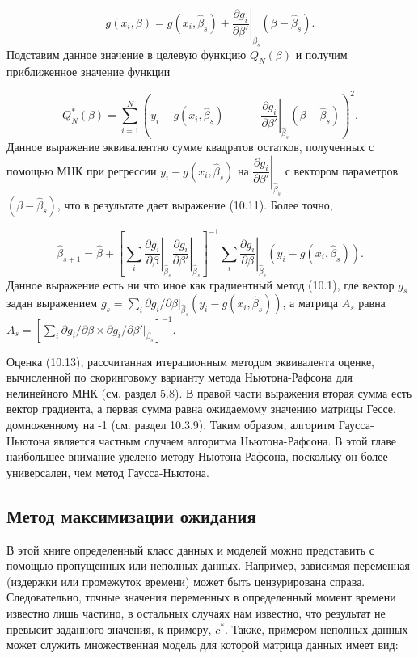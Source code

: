 \[
g(x_{i},\beta) = \left. g(x_i,\hat{\beta}_s)+\dfrac{\partial{g_i}}{\partial{\beta}'} \right|_{\hat{\beta}_s}(\beta-\hat{\beta}_s).
\]
Подставим данное значение в целевую функцию $Q_N (\beta)$ и получим приближенное значение функции

\[
Q^*_N(\beta) =  \sum^N_{i=1} \left(y_{i}-g(x_{i},\hat{\beta}_s) --- \left. \dfrac{\partial{g_i}}{\partial{\beta}'} \right|_{\hat{\beta}_s} (\beta-\hat{\beta}_s) \right)^2.
\]
Данное выражение эквивалентно сумме квадратов остатков, полученных с помощью МНК при  регрессии $y_{i}-g(x_{i},\hat{\beta}_s)$ на $\left. \dfrac{\partial{g_i}}{\partial{\beta}'} \right|_{\hat{\beta}_s}$ с вектором параметров $(\beta-\hat{\beta}_s)$, что в результате дает выражение (10.11). Более точно,

\begin{equation}
\hat{\beta}_{s+1} = \hat{\beta}+\left[ \sum_i \left. \dfrac{\partial{g_i}}{\partial{\beta}} \right|_{\hat{\beta}_s} \left. \dfrac{\partial{g_i}}{\partial{\beta}'} \right|_{\hat{\beta}_s} \right] ^{-1} \left. \sum_i \dfrac{\partial{g_i}}{\partial{\beta}} \right|_{\hat{\beta}_s} (y_i-g(x_i,\hat{\beta}_s)).
\end{equation}
Данное выражение есть ни что иное как градиентный метод (10.1), где вектор $g_s$ задан выражением $g_s=\sum_i \partial{g_i} / \partial{\beta}|_{\hat{\beta}_s} (y_i-g(x_i,\hat{\beta}_s))$, а матрица $A_s$ равна $A_s = [\sum_i \partial{g_i} / \partial{\beta} \times \partial{g_i} / \partial{\beta}'|_{\hat{\beta}_s}]^{-1}$.

Оценка (10.13), рассчитанная итерационным методом эквивалента оценке, вычисленной по скоринговому варианту метода Ньютона-Рафсона для нелинейного МНК (см. раздел 5.8). В правой части выражения вторая сумма есть вектор градиента, а первая сумма равна  ожидаемому значению матрицы Гессе, домноженному на -1 (см. раздел 10.3.9). Таким образом, алгоритм Гаусса-Ньютона является частным случаем алгоритма Ньютона-Рафсона. В этой главе наибольшее внимание уделено методу Ньютона-Рафсона, поскольку он более универсален, чем метод Гаусса-Ньютона.

\subsection{Метод максимизации ожидания}

В этой книге определенный класс данных и моделей можно представить с помощью пропущенных или неполных данных. Например, зависимая переменная (издержки или промежуток времени) может быть цензурирована справа. Следовательно, точные значения переменных в определенный момент времени известно лишь частино, в остальных случаях нам известно, что результат не превысит заданного значения, к примеру, $c^{*}$. Также, примером неполных данных может служить множественная модель для которой матрица данных имеет вид:

